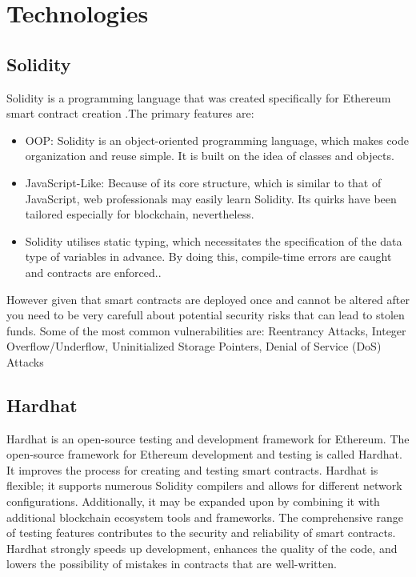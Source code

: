 \chapter{Technologies}

\section{Solidity}
\label{sec:ch3sec1}
Solidity is a programming language that was created specifically for Ethereum smart contract creation \cite{sdocs} .The primary features are:

\begin{itemize}
	\item OOP: Solidity is an object-oriented programming language, which makes code organization and reuse simple. It is built on the idea of classes and objects.
	\item JavaScript-Like: Because of its core structure, which is similar to that of JavaScript, web professionals may easily learn Solidity. Its quirks have been tailored especially for blockchain, nevertheless.
	\item Solidity utilises static typing, which necessitates the specification of the data type of variables in advance. By doing this, compile-time errors are caught and contracts are enforced..
\end{itemize}

However given that smart contracts are deployed once and cannot be altered after you need to be very carefull about potential security risks that can lead to stolen funds. Some of the most common vulnerabilities are: Reentrancy Attacks, Integer Overflow/Underflow, Uninitialized Storage Pointers, Denial of Service (DoS) Attacks \cite{solidityVulnerabilities}

\section{Hardhat}
\label{sec:ch3sec2}
Hardhat is an open-source testing and development framework for Ethereum. The open-source framework for Ethereum development and testing is called Hardhat. It improves the process for creating and testing smart contracts. Hardhat is flexible; it supports numerous Solidity compilers and allows for different network configurations. Additionally, it may be expanded upon by combining it with additional blockchain ecosystem tools and frameworks. The comprehensive range of testing features contributes to the security and reliability of smart contracts. Hardhat strongly speeds up development, enhances the quality of the code, and lowers the possibility of mistakes in contracts that are well-written.

